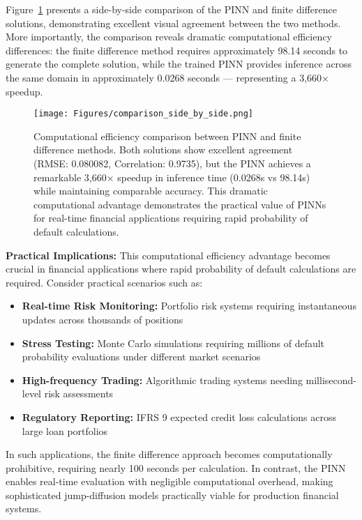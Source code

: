 \documentclass[11pt,twoside,openright]{report}
\begin{document}
Figure~\ref{fig:pinn_fd_comparison} presents a side-by-side comparison of the PINN and finite difference solutions, demonstrating excellent visual agreement between the two methods. More importantly, the comparison reveals dramatic computational efficiency differences: the finite difference method requires approximately 98.14 seconds to generate the complete solution, while the trained PINN provides inference across the same domain in approximately 0.0268 seconds — representing a 3,660× speedup.

\begin{figure}[htbp]
    \centering
    \texttt{[image: Figures/comparison\_side\_by\_side.png]}
    \caption{Computational efficiency comparison between PINN and finite difference methods. Both solutions show excellent agreement (RMSE: 0.080082, Correlation: 0.9735), but the PINN achieves a remarkable 3,660× speedup in inference time (0.0268s vs 98.14s) while maintaining comparable accuracy. This dramatic computational advantage demonstrates the practical value of PINNs for real-time financial applications requiring rapid probability of default calculations.}
    \label{fig:pinn_fd_comparison}
\end{figure}

\textbf{Practical Implications:} This computational efficiency advantage becomes crucial in financial applications where rapid probability of default calculations are required. Consider practical scenarios such as:
\begin{itemize}
    \item \textbf{Real-time Risk Monitoring:} Portfolio risk systems requiring instantaneous updates across thousands of positions
    \item \textbf{Stress Testing:} Monte Carlo simulations requiring millions of default probability evaluations under different market scenarios  
    \item \textbf{High-frequency Trading:} Algorithmic trading systems needing millisecond-level risk assessments
    \item \textbf{Regulatory Reporting:} IFRS 9 expected credit loss calculations across large loan portfolios
\end{itemize}

In such applications, the finite difference approach becomes computationally prohibitive, requiring nearly 100 seconds per calculation. In contrast, the PINN enables real-time evaluation with negligible computational overhead, making sophisticated jump-diffusion models practically viable for production financial systems.
\end{document}
